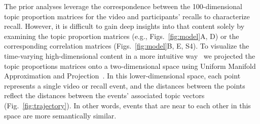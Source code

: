 \documentclass{article}
\newcommand{\corrmats}{S4}
\begin{document}
The prior analyses leverage the correspondence between the 100-dimensional topic proportion matrices for the video and participants' recalls to characterize recall.  However, it is difficult to gain deep insights into that content solely by examining the topic proportion matrices (e.g., Figs.~\ref{fig:model}A, D) or the corresponding correlation matrices (Figs.~\ref{fig:model}B, E, \corrmats).  To visualize the time-varying high-dimensional content in a more intuitive way~\citep{HeusEtal18a} we projected the topic proportions matrices onto a two-dimensional space using Uniform Manifold Approximation and Projection~\citep[UMAP; ][]{McInHeal18}.  In this lower-dimensional space, each point represents a single video or recall event, and the distances between the points reflect the distances between the events' associated topic vectors (Fig.~\ref{fig:trajectory}). In other words, events that are near to each other in this space are more semantically similar.
\end{document}
